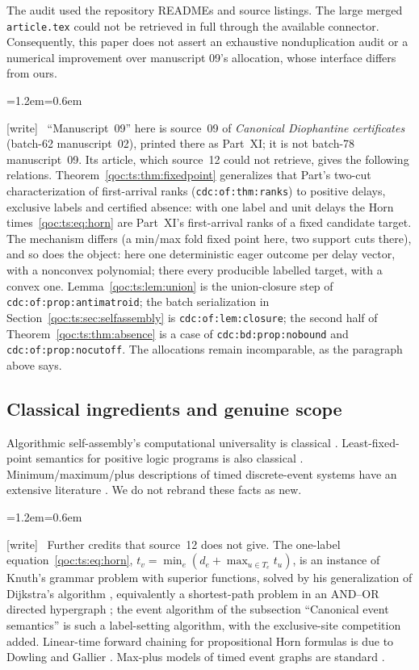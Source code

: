 \documentclass[11pt,letterpaper]{article}
\theoremstyle{definition}
\theoremstyle{remark}
\newcommand{\code}[1]{\nolinkurl{#1}}
\newcommand{\wtag}{\textup{[write]}}
\newenvironment{writenote}{\par\smallskip\begin{list}{}{\leftmargin=1.2em\rightmargin=0.6em}\item[]\small\wtag\ }{\end{list}\smallskip}
\newcommand{\lab}[1]{\nolinkurl{#1}}
\begin{document}
The audit used the repository READMEs and source listings. The large merged
\code{article.tex} could not be retrieved in full through the available
connector. Consequently, this paper does not assert an exhaustive
nonduplication audit or a numerical improvement over manuscript 09's
allocation, whose interface differs from ours.

\begin{writenote}
``Manuscript~09'' here is source~09 of \emph{Canonical Diophantine certificates} (batch-62 manuscript~02), printed there as Part~XI; it is not batch-78 manuscript~09. Its article, which source~12 could not retrieve, gives the following relations. Theorem~\ref{qoc:ts:thm:fixedpoint} generalizes that Part's two-cut characterization of first-arrival ranks (\lab{cdc:of:thm:ranks}) to positive delays, exclusive labels and certified absence: with one label and unit delays the Horn times~\eqref{qoc:ts:eq:horn} are Part~XI's first-arrival ranks of a fixed candidate target. The mechanism differs (a min/max fold fixed point here, two support cuts there), and so does the object: here one deterministic eager outcome per delay vector, with a nonconvex polynomial; there every producible labelled target, with a convex one. Lemma~\ref{qoc:ts:lem:union} is the union-closure step of \lab{cdc:of:prop:antimatroid}; the batch serialization in Section~\ref{qoc:ts:sec:selfassembly} is \lab{cdc:of:lem:closure}; the second half of Theorem~\ref{qoc:ts:thm:absence} is a case of \lab{cdc:bd:prop:nobound} and \lab{cdc:of:prop:nocutoff}. The allocations remain incomparable, as the paragraph above says.
\end{writenote}

\subsection{Classical ingredients and genuine scope}
Algorithmic self-assembly's computational universality is classical
\cite{ts:winfree}. Least-fixed-point semantics for positive logic programs is
also classical \cite{ts:vanemden}. Minimum/maximum/plus descriptions of timed
discrete-event systems have an extensive literature
\cite{ts:cochet}. We do not rebrand these facts as new.

\begin{writenote}
Further credits that source~12 does not give. The one-label equation~\eqref{qoc:ts:eq:horn}, $t_v=\min_e(d_e+\max_{u\in T_e}t_u)$, is an instance of Knuth's grammar problem with superior functions, solved by his generalization of Dijkstra's algorithm \cite{w:knuth77}, equivalently a shortest-path problem in an AND--OR directed hypergraph \cite{w:gallo93}; the event algorithm of the subsection ``Canonical event semantics'' is such a label-setting algorithm, with the exclusive-site competition added. Linear-time forward chaining for propositional Horn formulas is due to Dowling and Gallier \cite{w:dowling84}. Max-plus models of timed event graphs are standard \cite{w:bcoq92}.
\end{writenote}
\end{document}
